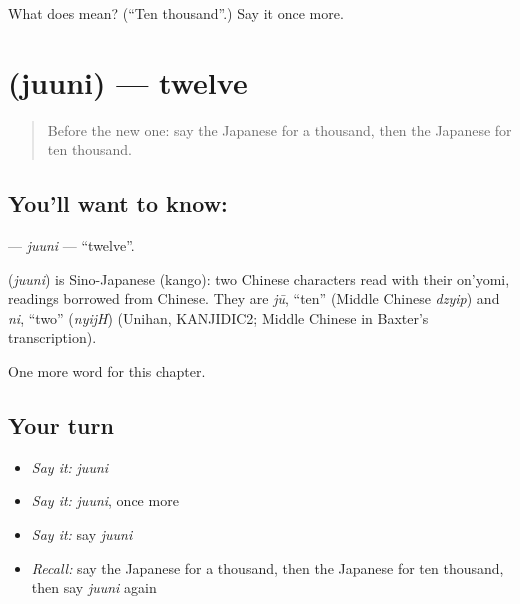 \begin{tcolorbox}[breakable,colback=teal!4,colframe=teal!35!black,title={Before you move on}]
What does  mean? (\textquotedblleft{}Ten thousand\textquotedblright{}.) Say it once more.
\end{tcolorbox}
\section[\texorpdfstring{\ja{じゅうに} (juuni)}{じゅうに (juuni)}]{ (juuni) — twelve}

\label{lesson:JA-C60-juuni}



\begin{quote}
Before the new one: say the Japanese for a thousand, then the Japanese for ten thousand.
\end{quote}

\subsection*{You'll want to know: }
\textbf{} — \emph{juuni} — \textquotedblleft{}twelve\textquotedblright{}.

\begin{cousinweb}
\textbf{} (\emph{juuni}) is Sino-Japanese (kango): two Chinese characters read with their on'yomi, readings borrowed from Chinese. They are \emph{jū}, \textquotedblleft{}ten\textquotedblright{} (Middle Chinese \emph{dzyip}) and \emph{ni}, \textquotedblleft{}two\textquotedblright{} (\emph{nyijH}) (Unihan, KANJIDIC2; Middle Chinese in Baxter's transcription).
\end{cousinweb}

\begin{grammarlens}[title={What you've built}]
One more word for this chapter.
\end{grammarlens}

\subsection*{Your turn}
\begin{itemize}
\raggedright
  \item \emph{Say it:} \emph{juuni}
  \item \emph{Say it:} \emph{juuni}, once more
  \item \emph{Say it:} say \emph{juuni}
  \item \emph{Recall:} say the Japanese for a thousand, then the Japanese for ten thousand, then say \emph{juuni} again
\end{itemize}

